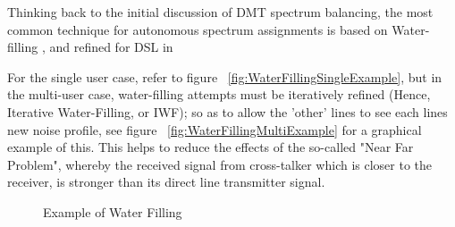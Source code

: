 Thinking back to the initial discussion of DMT spectrum balancing, the most common technique for autonomous spectrum assignments is based on Water-filling \cite{CS48}, and refined for DSL in \cite{WYaJC00} \cite{WY01}

For the single user case, refer to figure ~\ref{fig:WaterFillingSingleExample}, but in the multi-user case, water-filling attempts must be iteratively refined (Hence, Iterative Water-Filling, or IWF); so as to allow the 'other' lines to see each lines new noise profile, see figure ~\ref{fig:WaterFillingMultiExample} for a graphical example of this. This helps to reduce the effects of the so-called "Near Far Problem", whereby the received signal from cross-talker which is closer to the receiver, is stronger than its direct line transmitter signal.

\begin{figure}[h!]
  \centering
  \caption{Example of Water Filling}
\end{figure}

